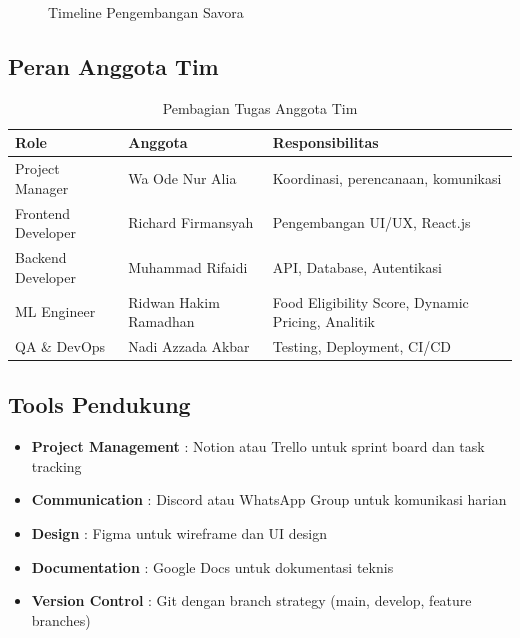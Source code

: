 \begin{figure}[H]
\centering
\caption{Timeline Pengembangan Savora}
\label{fig:gantt}
\end{figure}

\subsection{Peran Anggota Tim}

\begin{table}[H]
\centering
\caption{Pembagian Tugas Anggota Tim}
\label{tab:peran}
\begin{tabularx}{\textwidth}{|l|Y|Y|}
\hline
\textbf{Role} & \textbf{Anggota} & \textbf{Responsibilitas} \\
\hline
Project Manager & Wa Ode Nur Alia & Koordinasi, perencanaan, komunikasi \\
\hline
Frontend Developer & Richard Firmansyah & Pengembangan UI/UX, React.js \\
\hline
Backend Developer & Muhammad Rifaidi & API, Database, Autentikasi \\
\hline
ML Engineer & Ridwan Hakim Ramadhan & Food Eligibility Score, Dynamic Pricing, Analitik \\
\hline
QA \& DevOps & Nadi Azzada Akbar & Testing, Deployment, CI/CD \\
\hline
\end{tabularx}
\end{table}

\subsection{Tools Pendukung}

\begin{itemize}[leftmargin=*]
    \item \textbf{Project Management} : Notion atau Trello untuk sprint board dan task tracking
    \item \textbf{Communication} : Discord atau WhatsApp Group untuk komunikasi harian
    \item \textbf{Design} : Figma untuk wireframe dan UI design
    \item \textbf{Documentation} : Google Docs untuk dokumentasi teknis
    \item \textbf{Version Control} : Git dengan branch strategy (main, develop, feature branches)
\end{itemize}

